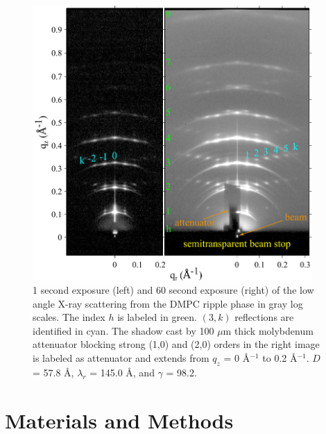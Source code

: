 \begin{figure}[htbp]
  \centering
  \includegraphics[width=0.95\textwidth]{figures/ripple/ripple083and085}
  \caption{1 second exposure (left) and 60 second exposure (right) of the low
  angle X-ray scattering from the DMPC ripple phase in gray log scales. 
  The index $h$ is 
  labeled in green. $(3,k)$ reflections are identified in cyan. 
  The shadow cast by 100 $\mu$m thick molybdenum attenuator blocking
  strong (1,0) and (2,0) orders in the right image is labeled as attenuator
  and extends from $q_z$ = 0 \AA$^{-1}$ to 0.2 \AA$^{-1}$.
  $D$ = 57.8 \AA, $\lambda_r$ = 145.0 \AA, and $\gamma$ = 98.2\textdegree.}
  \label{fig:ripple_laxs_images}  
\end{figure} 

\newpage
\section{Materials and Methods}\label{sec:ripple_MMs}
